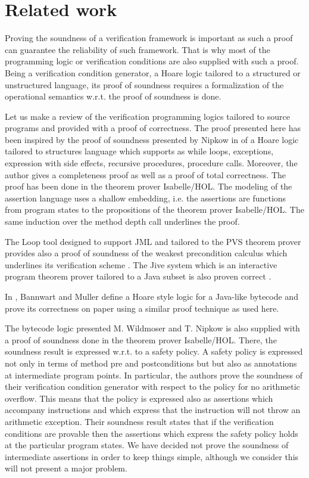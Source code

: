 \section{Related work}\label{proof:relWork}

Proving the soundness of a verification framework is important as such a proof 
can guarantee the reliability of such framework. That is why most of the programming logic
or verification conditions are also supplied with such a proof. 
Being  a verification condition generator, a Hoare logic tailored to a structured or unstructured language, 
 its proof of soundness requires a formalization of the operational semantics  w.r.t. the proof of soundness is done.  

 Let us make a review of the verification programming logics tailored to source programs and provided with a proof
 of correctness. The proof presented here has been inspired by the proof of soundness presented by Nipkow in \cite{Nipkow-MOD2001}
 of a Hoare logic tailored to structures language which supports as while loops, exceptions, expression with side effects,
 recursive procedures, procedure calls. Moreover, the author gives a completeness proof  as well as a proof of  total correctness.
  The proof has been done in the theorem prover Isabelle/HOL. The modeling of the 
 assertion language uses a  shallow embedding, i.e. the assertions are functions from program states to 
  the propositions of the theorem prover Isabelle/HOL. The same induction over the method depth call underlines the proof. 

 The Loop tool designed to support JML and tailored to the PVS theorem prover
  provides also a proof of soundness of the weakest precondition calculus which underlines
 its verification scheme \cite{Jacobs04WPJ}. The Jive system which is an interactive program theorem prover tailored to a Java subset is
 also  proven correct \cite{MH00Arc}.
   
 In \cite{BannwartMueller05}, Bannwart and Muller define a   Hoare style
 logic for a Java-like bytecode and prove its correctness on paper using a similar proof 
 technique as used here. 

 The bytecode logic presented  M. Wildmoser and T. Nipkow \cite{WildmoserN-ESOP05} is  also  supplied with a proof of soundness  done in the theorem prover Isabelle/HOL.
 There, the soundness result is expressed w.r.t. to a safety policy. A safety policy is expressed not only in terms of
  method pre and postconditions but but also as annotations at intermediate  program  points.
 In particular, the authors prove the soundness of their verification condition generator with respect to 
the policy for no arithmetic overflow.  This means that the policy is expressed also as assertions which 
accompany instructions and which express that the instruction will not throw an arithmetic exception.
Their soundness result states that if the verification conditions are provable then
 the assertions which express the safety policy holds at the particular program states. 
We have decided not prove the soundness of intermediate assertions in order to keep things simple,
 although we consider this will not present a major problem.%

